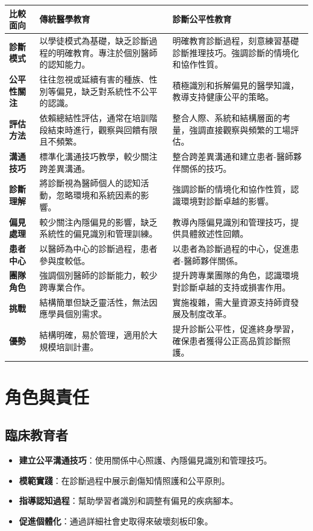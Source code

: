 \documentclass[12pt,a4paper]{article}
\begin{document}
\begin{longtable}{p{3cm}|p{6cm}|p{6cm}}
    \toprule
    \textbf{比較面向} & \textbf{傳統醫學教育} & \textbf{診斷公平性教育} \\
    \midrule
    \endhead
    \textbf{診斷模式} & 
    以學徒模式為基礎，缺乏診斷過程的明確教育。專注於個別醫師的認知能力。 & 
    明確教育診斷過程，刻意練習基礎診斷推理技巧。強調診斷的情境化和協作性質。 \\
    \midrule
    \textbf{公平性關注} & 
    往往忽視或延續有害的種族、性別等偏見，缺乏對系統性不公平的認識。 & 
    積極識別和拆解偏見的醫學知識，教導支持健康公平的策略。 \\
    \midrule
    \textbf{評估方法} & 
    依賴總結性評估，通常在培訓階段結束時進行，觀察與回饋有限且不頻繁。 & 
    整合人際、系統和結構層面的考量，強調直接觀察與頻繁的工場評估。 \\
    \midrule
    \textbf{溝通技巧} & 
    標準化溝通技巧教學，較少關注跨差異溝通。 & 
    整合跨差異溝通和建立患者-醫師夥伴關係的技巧。 \\
    \midrule
    \textbf{診斷理解} & 
    將診斷視為醫師個人的認知活動，忽略環境和系統因素的影響。 & 
    強調診斷的情境化和協作性質，認識環境對診斷卓越的影響。 \\
    \midrule
    \textbf{偏見處理} & 
    較少關注內隱偏見的影響，缺乏系統性的偏見識別和管理訓練。 & 
    教導內隱偏見識別和管理技巧，提供具體敘述性回饋。 \\
    \midrule
    \textbf{患者中心} & 
    以醫師為中心的診斷過程，患者參與度較低。 & 
    以患者為診斷過程的中心，促進患者-醫師夥伴關係。 \\
    \midrule
    \textbf{團隊角色} & 
    強調個別醫師的診斷能力，較少跨專業合作。 & 
    提升跨專業團隊的角色，認識環境對診斷卓越的支持或損害作用。 \\
    \midrule
    \textbf{挑戰} & 
    結構簡單但缺乏靈活性，無法因應學員個別需求。 & 
    實施複雜，需大量資源支持師資發展及制度改革。 \\
    \midrule
    \textbf{優勢} & 
    結構明確，易於管理，適用於大規模培訓計畫。 & 
    提升診斷公平性，促進終身學習，確保患者獲得公正高品質診斷照護。 \\
    \bottomrule
\end{longtable}

\section{角色與責任}

\subsection{臨床教育者}
\begin{itemize}[nosep]
    \item \textbf{建立公平溝通技巧}：使用關係中心照護、內隱偏見識別和管理技巧。
    \item \textbf{模範實踐}：在診斷過程中展示創傷知情照護和公平原則。
    \item \textbf{指導認知過程}：幫助學習者識別和調整有偏見的疾病腳本。
    \item \textbf{促進個體化}：通過詳細社會史取得來破壞刻板印象。
\end{itemize}
\end{document}
